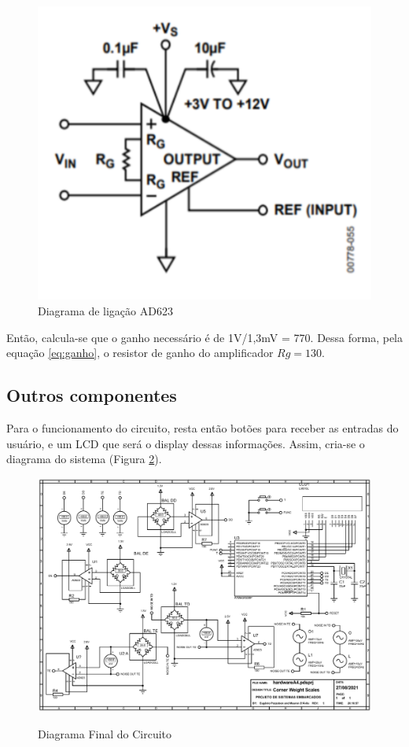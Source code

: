 \documentclass[a4paper, 12pt]{article}
\begin{document}
\begin{figure}[!htb]
	\centering
	\includegraphics[width=.5\linewidth]{AD623}
	\caption{Diagrama de ligação AD623}
	\label{fig:AD}
\end{figure}

Então, calcula-se que o ganho necessário é de 1V/1,3mV = 770. Dessa forma, pela equação \ref{eq:ganho}, o resistor de ganho do amplificador $ Rg = 130 $. 


\subsection{Outros componentes}

Para o funcionamento do circuito, resta então botões para receber as entradas do usuário, e um LCD que será o display dessas informações. Assim, cria-se o diagrama do sistema (Figura \ref{fig:hardwarefinal}). 

\begin{figure}[!htb]
	\centering
	\caption{Diagrama Final do Circuito}
	\includegraphics[width=.85\linewidth]{hardwareA4}
	\label{fig:hardwarefinal}
	
\end{figure}
\end{document}
